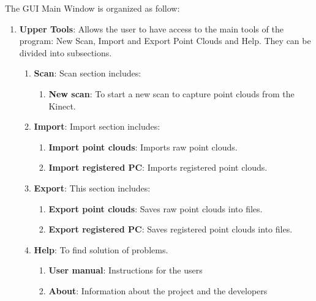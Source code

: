 \documentclass[aps,letterpaper,11pt]{revtex4}
\begin{document}
The GUI Main Window is organized as follow:

\begin{enumerate}
  \item \textbf{Upper Tools}: Allows the user to have access to the main tools of the program: New Scan, Import and Export Point Clouds and Help. They can be divided into subsections.
\begin{enumerate}
  \item \textbf{Scan}: Scan section includes:
\begin{enumerate}
  \item \textbf{New scan}: To start a new scan to capture point clouds from the Kinect.
\end{enumerate}
  \item \textbf{Import}: Import section includes:
\begin{enumerate}
  \item \textbf{Import point clouds}: Imports raw point clouds.
  \item \textbf{Import registered PC}: Imports registered point clouds.
\end{enumerate}
  \item \textbf{Export}: This section includes:
\begin{enumerate}
  \item \textbf{Export point clouds}: Saves raw point clouds into files.
 \item \textbf{Export registered PC}: Saves registered point clouds into files.
\end{enumerate}
  \item \textbf{Help}: To find solution of problems.
\begin{enumerate}
  \item \textbf{User manual}: Instructions for the users
 \item \textbf{About}: Information about the project and the developers
\end{enumerate}
\end{enumerate}


\end{enumerate}
\end{document}
